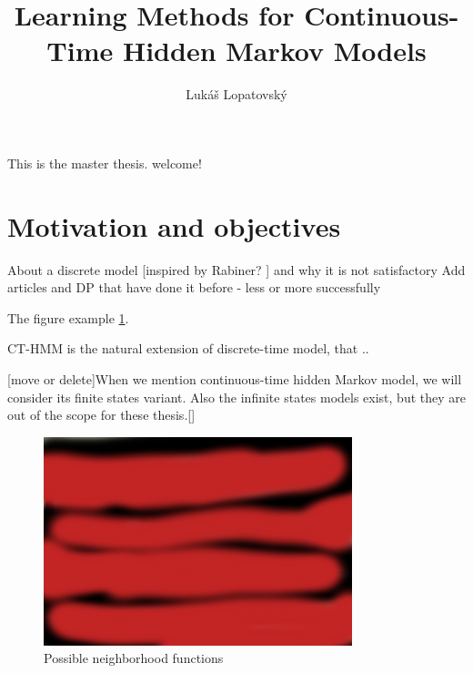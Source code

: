 \documentclass[thesis=M,english]{FITthesis}[2012/10/20]
\title{Learning Methods for Continuous-Time Hidden Markov Models}
\author{Luk{\' a}{\v s} Lopatovsk{\' y}} %
\begin{document}


\begin{introduction}
	This is the master thesis. welcome!
	\section{Motivation and objectives}
	About a discrete model [inspired by Rabiner? ] and why it is not satisfactory  %
	Add articles and DP that have done it before - less or more successfully 
	
The figure example \ref{fig:gb}.

CT-HMM is the natural extension of discrete-time model, that ..

[move or delete]When we mention continuous-time hidden Markov model, we will consider its finite states variant. Also the infinite states models exist, but they are out of the scope for these thesis.[]


\begin{figure}[h]
\centering
\includegraphics[width=0.8\textwidth]{img/ps.jpg}
\caption{Possible neighborhood functions \cite{Ho03} }
\label{fig:gb}
\end{figure} 	
	
	
\end{introduction}
\end{document}
